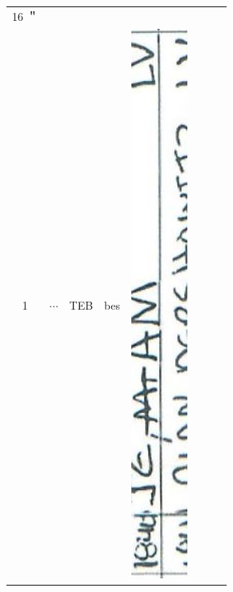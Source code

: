 \documentclass[10pt]{article}
\begin{document}
\begin{center}
\begin{tabular}{|c|c|c|c|c|c|c|c|}
 &  &  &  \\
\hline
16 ＂ &  &  &  &  &  &  &  \\
\hline
1 & \(\cdots\) & TEB & bes & \includegraphics[max width=\textwidth]{2025_02_27_dd68c3d38de88f0516d9g-122(6)}

\end{tabular}
\end{center}
\end{document}
